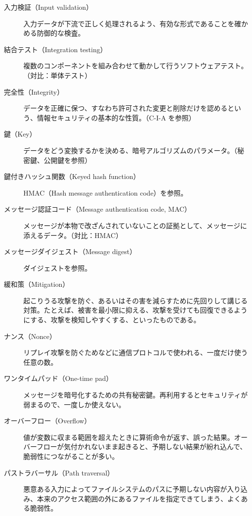 \documentclass[uplatex]{jsarticle}
\begin{document}
\begin{description}
\item[入力検証（Input validation）]
入力データが下流で正しく処理されるよう、有効な形式であることを確かめる防御的な検査。

\item[結合テスト（Integration testing）]
複数のコンポーネントを組み合わせて動かして行うソフトウェアテスト。（対比：単体テスト）

\item[完全性（Integrity）]
データを正確に保つ、すなわち許可された変更と削除だけを認めるという、情報セキュリティの基本的な性質。（C-I-A を参照）

\item[鍵（Key）]
データをどう変換するかを決める、暗号アルゴリズムのパラメータ。（秘密鍵、公開鍵を参照）

\item[鍵付きハッシュ関数（Keyed hash function）]
HMAC（Hash message authentication code）を参照。

\item[メッセージ認証コード（Message authentication code, MAC）]
メッセージが本物で改ざんされていないことの証拠として、メッセージに添えるデータ。（対比：HMAC）

\item[メッセージダイジェスト（Message digest）]
ダイジェストを参照。

\item[緩和策（Mitigation）]
起こりうる攻撃を防ぐ、あるいはその害を減らすために先回りして講じる対策。たとえば、被害を最小限に抑える、攻撃を受けても回復できるようにする、攻撃を検知しやすくする、といったものである。

\item[ナンス（Nonce）]
リプレイ攻撃を防ぐためなどに通信プロトコルで使われる、一度だけ使う任意の数。

\item[ワンタイムパッド（One-time pad）]
メッセージを暗号化するための共有秘密鍵。再利用するとセキュリティが弱まるので、一度しか使えない。

\item[オーバーフロー（Overflow）]
値が変数に収まる範囲を超えたときに算術命令が返す、誤った結果。オーバーフローが気付かれないまま起きると、予期しない結果が紛れ込んで、脆弱性につながることが多い。

\item[パストラバーサル（Path traversal）]
悪意ある入力によってファイルシステムのパスに予期しない内容が入り込み、本来のアクセス範囲の外にあるファイルを指定できてしまう、よくある脆弱性。


\end{description}
\end{document}
